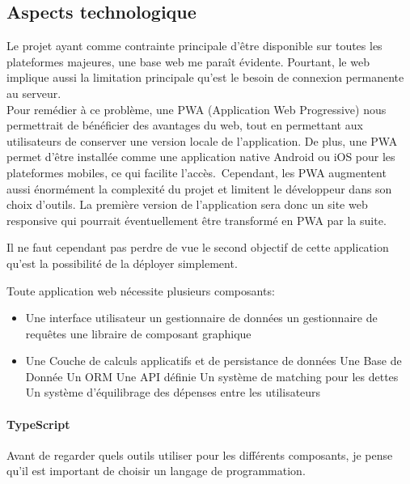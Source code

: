 
\subsection{Aspects technologique}\label{subsec:aspects-technologique}
Le projet ayant comme contrainte principale d'être disponible sur toutes les plateformes majeures, une base web me paraît évidente.
Pourtant, le web implique aussi la limitation principale qu'est le besoin de connexion permanente au serveur.\\

Pour remédier à ce problème, une PWA (Application Web Progressive) nous permettrait de bénéficier des avantages du web,
tout en permettant aux utilisateurs de conserver une version locale de l'application.
De plus, une PWA permet d'être installée comme une application native Android ou iOS pour les plateformes mobiles, ce qui facilite l'accès.\
Cependant, les PWA augmentent aussi énormément la complexité du projet et limitent le développeur dans son choix d'outils.
La première version de l'application sera donc un site web responsive qui pourrait éventuellement être transformé en PWA par la suite.

Il ne faut cependant pas perdre de vue le second objectif de cette application qu'est la possibilité de la déployer simplement.

Toute application web nécessite plusieurs composants:
\begin{itemize}
    \item Une interface utilisateur
    \subitem un gestionnaire de données
    \subitem un gestionnaire de requêtes
    \subitem une libraire de composant graphique
    \item Une Couche de calculs applicatifs et de persistance de données
    \subitem Une Base de Donnée
    \subitem Un ORM
    \subitem Une API définie
    \subitem Un système de matching pour les dettes
    \subitem Un système d'équilibrage des dépenses entre les utilisateurs
\end{itemize}

\paragraph{TypeScript}
Avant de regarder quels outils utiliser pour les différents composants, je pense qu'il est important de choisir un langage de programmation.\\

